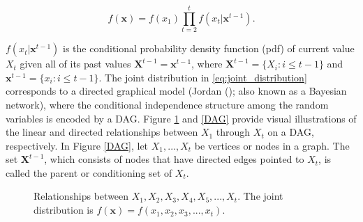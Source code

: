 \documentclass[
  letterpaper,
  double,
  12pt,
  1.0in]{beavtex}
\begin{document}
\begin{equation}
f(\textbf{x}) = f(x_1) \prod_{t=2}^t f(x_t | \textbf{x}^{t-1}). 
\label{eq:joint_distribution}
\end{equation}

\(f(x_t | \textbf{x}^{t-1})\) is the conditional probability density
function (pdf) of current value \(X_t\) given all of its past values
\(\textbf{X}^{t-1} = \textbf{x}^{t-1}\), where
\(\textbf{X}^{t-1} = \{X_i: i \leq t - 1 \}\) and
\(\textbf{x}^{t-1} = \{x_i: i \leq t - 1 \}\). The joint distribution in
\eqref{eq:joint_distribution} corresponds to a directed graphical model
(Jordan (); also known as a
Bayesian network), where the conditional independence structure among
the random variables is encoded by a DAG. Figure \ref{Linear} and
\ref{DAG} provide visual illustrations of the linear and directed
relationships between \(X_1\) through \(X_t\) on a DAG, respectively. In
Figure \ref{DAG}, let \(X_1, ..., X_t\) be vertices or nodes in a graph.
The set \(\textbf{X}^{t-1}\), which consists of nodes that have directed
edges pointed to \(X_t\), is called the parent or conditioning set of
\(X_t\).

\begin{figure}[htbp]  %
    \centering     %
    \caption{Relationships between $X_1, X_2, X_3, X_4, X_5, ..., X_t$. The joint distribution is $f(\textbf{x}) = f(x_1, x_2, x_3, ..., x_t)$.}
    \label{Linear}
\end{figure}
\end{document}
